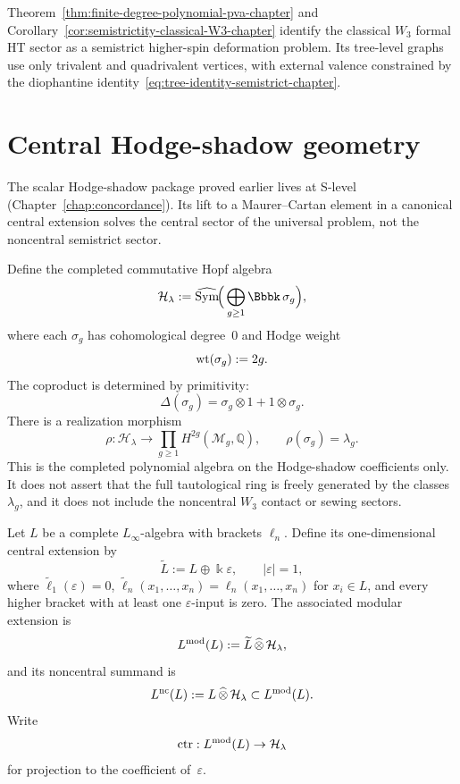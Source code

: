 \begin{remark}
\label{rem:first-reduction-gravitational-problem}
Theorem~\ref{thm:finite-degree-polynomial-pva-chapter} and
Corollary~\ref{cor:semistrictity-classical-W3-chapter} identify the
classical $W_3$ formal HT sector as a semistrict higher-spin
deformation problem. Its tree-level graphs use only trivalent and
quadrivalent vertices, with external valence constrained by the
diophantine identity~\eqref{eq:tree-identity-semistrict-chapter}.
\end{remark}

\section{Central Hodge-shadow geometry}
\label{sec:central-hodge-shadow-geometry}

The scalar Hodge-shadow package proved earlier lives at S-level
(Chapter~\ref{chap:concordance}). Its lift to a Maurer--Cartan element
in a canonical central extension solves the central sector of the
universal problem, not the noncentral semistrict sector.

\begin{definition}
\label{def:hodge-shadow-coefficient-algebra-chapter}
Define the completed commutative Hopf algebra
\[
\mathcal H_{\lambda}:=\widehat{\Sym}\!\Big(\bigoplus_{g\ge 1}\Bbbk\,\sigma_g\Big),
\]
where each $\sigma_g$ has cohomological degree~$0$ and Hodge weight
\[
\operatorname{wt}(\sigma_g):=2g.
\]
The coproduct is determined by primitivity:
\[
\Delta(\sigma_g)=\sigma_g\otimes 1 + 1\otimes \sigma_g.
\]
There is a realization morphism
\[
\rho:\mathcal H_{\lambda}\longrightarrow \prod_{g\ge 1} H^{2g}(\mathcal M_g,\mathbb Q),
\qquad
\rho(\sigma_g)=\lambda_g.
\]
This is the completed polynomial algebra on the Hodge-shadow
coefficients only. It does not assert that the full tautological ring is
freely generated by the classes \(\lambda_g\), and it does not include
the noncentral \(W_3\) contact or sewing sectors.
\end{definition}

\begin{definition}
\label{def:central-hodge-shadow-extension-chapter}
Let $L$ be a complete $L_\infty$-algebra with brackets $\ell_n$. Define
its one-dimensional central extension by
\[
\widetilde L:=L\oplus \Bbbk\varepsilon,
\qquad
|\varepsilon|=1,
\]
where \(\widetilde\ell_1(\varepsilon)=0\),
\(\widetilde\ell_n(x_1,\ldots,x_n)=\ell_n(x_1,\ldots,x_n)\) for
\(x_i\in L\), and every higher bracket with at least one
\(\varepsilon\)-input is zero.
The associated modular extension is
\[
L^{\mathrm{mod}}(L):=\widetilde L\,\widehat{\otimes}\,\mathcal H_{\lambda},
\]
and its noncentral summand is
\[
L^{\mathrm{nc}}(L):=L\,\widehat{\otimes}\,\mathcal H_{\lambda}
\subset L^{\mathrm{mod}}(L).
\]
Write
\[
\operatorname{ctr}:L^{\mathrm{mod}}(L)\to \mathcal H_{\lambda}
\]
for projection to the coefficient of~$\varepsilon$.
\end{definition}

